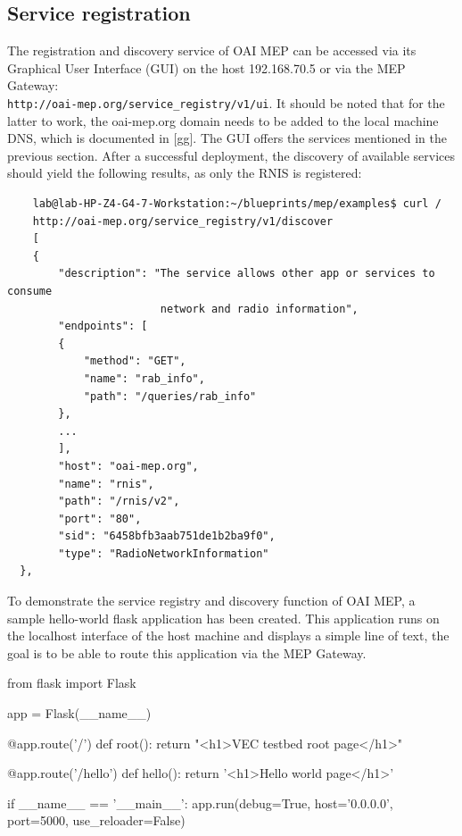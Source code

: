 \documentclass[12pt,a4paper,twoside]{report}
\begin{document}
\subsection{Service registration}
The registration and discovery service of OAI MEP can be accessed via its Graphical User Interface (GUI) on the host 192.168.70.5 or via the MEP Gateway: \\ \verb |http://oai-mep.org/service_registry/v1/ui|. It should be noted that for the latter to work, the oai-mep.org domain needs to be added to the local machine DNS, which is documented in [gg]. The GUI offers the services mentioned in the previous section. After a successful deployment, the discovery of available services should yield the following results, as only the RNIS is registered:
\begin{verbatim}
	lab@lab-HP-Z4-G4-7-Workstation:~/blueprints/mep/examples$ curl /
	http://oai-mep.org/service_registry/v1/discover 
	[
	{
		"description": "The service allows other app or services to consume
						network and radio information",
		"endpoints": [
		{
			"method": "GET",
			"name": "rab_info",
			"path": "/queries/rab_info"
		},
		...
		],
		"host": "oai-mep.org",
		"name": "rnis",
		"path": "/rnis/v2",
		"port": "80",
		"sid": "6458bfb3aab751de1b2ba9f0",
		"type": "RadioNetworkInformation"
  },

\end{verbatim}
To demonstrate the service registry and discovery function of OAI MEP, a sample hello-world flask application has been created. This application runs on the localhost interface of the host machine and displays a simple line of text, the goal is to be able to route this application via the MEP Gateway.
\begin{flask}[caption={Sample flask app in python}]
	from flask import Flask

	app = Flask(__name__)

	@app.route('/')
	def root():
		return "<h1>VEC testbed root page</h1>"

	@app.route('/hello')
	def hello():
		return '<h1>Hello world page</h1>'

	if __name__ == '__main__':
		app.run(debug=True, host='0.0.0.0', port=5000, use_reloader=False)
\end{flask}
\end{document}
